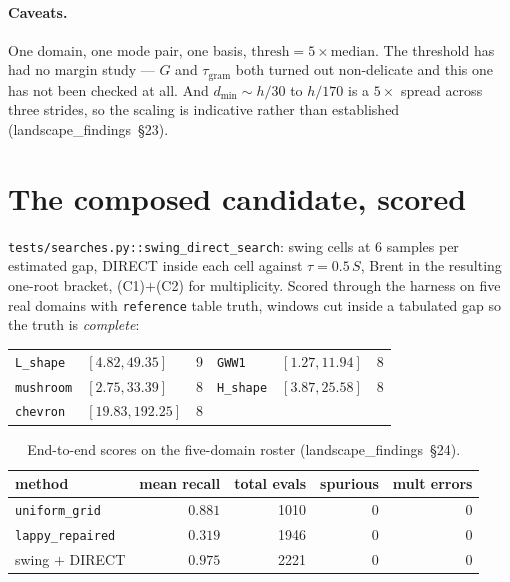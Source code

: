 \documentclass[11pt]{article}
\newcommand{\file}[1]{\texttt{#1}}
\newcommand{\lf}[1]{(landscape\_findings~\S#1)}
\begin{document}
\paragraph{Caveats.} One domain, one mode pair, one basis, $\text{thresh} = 5\times\text{median}$.
The threshold has had no margin study --- $G$ and $\tau_{\mathrm{gram}}$ both turned out
non-delicate and this one has not been checked at all. And $d_{\min} \sim h/30$ to $h/170$ is a
$5\times$ spread across three strides, so the scaling is indicative rather than established
\lf{23}.

\section{The composed candidate, scored}
\label{sec:composed}

\verb|tests/searches.py::swing_direct_search|: swing cells at 6 samples per estimated gap, DIRECT
inside each cell against $\tau = 0.5\,S$, Brent in the resulting one-root bracket, (C1)$+$(C2) for
multiplicity. Scored through the harness on five real domains with \verb|reference| table truth,
windows cut inside a tabulated gap so the truth is \emph{complete}:

\begin{center}
\begin{tabular}{ll@{\ }r@{\qquad}ll@{\ }r}
\toprule
\file{L\_shape} & $[4.82, 49.35]$ & 9 & \file{GWW1}    & $[1.27, 11.94]$   & 8 \\
\file{mushroom} & $[2.75, 33.39]$ & 8 & \file{H\_shape}& $[3.87, 25.58]$   & 8 \\
\file{chevron}  & $[19.83, 192.25]$ & 8 \\
\bottomrule
\end{tabular}
\end{center}

\begin{table}[htbp]
\centering
\caption{End-to-end scores on the five-domain roster \lf{24}.}
\label{tab:e2e}
\begin{tabular}{lrrrr}
\toprule
method & mean recall & total evals & spurious & mult errors \\
\midrule
\verb|uniform_grid|   & $0.881$ & 1010 & 0 & 0 \\
\verb|lappy_repaired| & $0.319$ & 1946 & 0 & 0 \\
swing $+$ DIRECT      & $0.975$ & 2221 & 0 & 0 \\
\bottomrule
\end{tabular}
\end{table}
\end{document}
